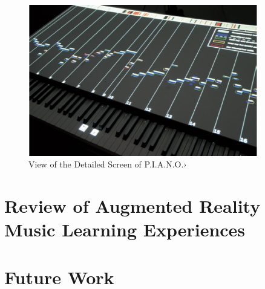 \documentclass{article}
\begin{document}
\begin{figure}
    \centering
    \includegraphics[width=10cm]{figures/piano}
    \caption{View of the Detailed Screen of P.I.A.N.O.› }
    \label{fig:View from the HeadMounted}
\end{figure}



\section{Review of Augmented Reality Music Learning Experiences}



\section{Future Work}














\end{document}
